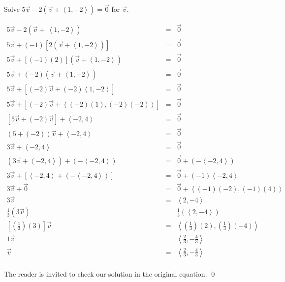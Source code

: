 \documentclass{ximera}
\begin{document}
\begin{example} \label{vectoreqnex}  Solve $5\overrightarrow{v} - 2\left(\overrightarrow{v} + \left<1,-2\right>\right) = \overrightarrow{0}$ for $\overrightarrow{v}$.



\begin{explanation} 

\[ \begin{array}{rcl}

5\overrightarrow{v} - 2\left(\overrightarrow{v} +\ \left<1,-2\right>\right) & = &  \overrightarrow{0} \\
5\overrightarrow{v} + (-1)\left[ 2\left(\overrightarrow{v} +\left<1,-2\right>\right)\right] & = &  \overrightarrow{0}\\
5\overrightarrow{v} + [(-1)(2)]\left(\overrightarrow{v} + \left<1,-2\right>\right) &  = &  \overrightarrow{0}\\
5\overrightarrow{v} + (-2)\left(\overrightarrow{v} + \left<1,-2\right>\right)  &  = &  \overrightarrow{0}\\
5\overrightarrow{v} + \left[(-2)\overrightarrow{v} + (-2)\left<1,-2\right> \right] &  = &  \overrightarrow{0}\\
5\overrightarrow{v} + \left[(-2)\overrightarrow{v} + \left<(-2)(1),(-2)(-2)\right> \right] &  = &  \overrightarrow{0}\\
\left[5\overrightarrow{v} + (-2)\overrightarrow{v}\right] + \left<-2,4\right> &  = &  \overrightarrow{0}\\
(5 + (-2)) \overrightarrow{v} + \left<-2,4\right>  &  = &  \overrightarrow{0}\\
3\overrightarrow{v} + \left<-2,4\right>  &  = &  \overrightarrow{0}\\
\left(3\overrightarrow{v} + \left<-2,4\right>\right) + \left(- \left<-2,4\right>\right)  &  = &  \overrightarrow{0} + \left(- \left<-2,4\right>\right)\\
3\overrightarrow{v} + \left[\left<-2,4\right> + \left(- \left<-2,4\right>\right)\right]  &  = &  \overrightarrow{0} +  (-1) \left<-2,4\right>\\
3\overrightarrow{v} + \overrightarrow{0}  &  = &  \overrightarrow{0} +  \left<(-1)(-2),(-1)(4)\right>\\
3\overrightarrow{v}   &  = &   \left<2,-4\right>\\  
\frac{1}{3} \left(3\overrightarrow{v} \right)  &  = &   \frac{1}{3} \left(\left<2,-4\right>\right)\\  
\left[\left(\frac{1}{3}\right) (3) \right]\overrightarrow{v}   &  = &   \left< \left(\frac{1}{3}\right)(2), \left(\frac{1}{3}\right)(-4)\right>\\  
 1 \overrightarrow{v} & = & \left< \frac{2}{3}, -\frac{4}{3} \right> \\  
 \overrightarrow{v} & =&  \left< \frac{2}{3}, -\frac{4}{3} \right> \\
\end{array} \]

The reader is invited to check our solution in the original equation.  \qed

\end{explanation}
\end{example}
\end{document}

